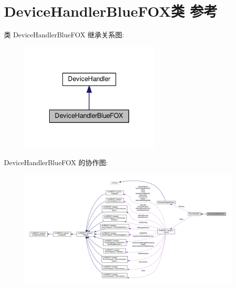 \hypertarget{class_device_handler_blue_f_o_x}{\section{Device\+Handler\+Blue\+F\+O\+X类 参考}
\label{class_device_handler_blue_f_o_x}
}


类 Device\+Handler\+Blue\+F\+O\+X 继承关系图\+:
\nopagebreak
\begin{figure}[H]
\begin{center}
\leavevmode
\includegraphics[width=200pt]{class_device_handler_blue_f_o_x__inherit__graph}
\end{center}
\end{figure}


Device\+Handler\+Blue\+F\+O\+X 的协作图\+:
\nopagebreak
\begin{figure}[H]
\begin{center}
\leavevmode
\includegraphics[width=350pt]{class_device_handler_blue_f_o_x__coll__graph}
\end{center}
\end{figure}
